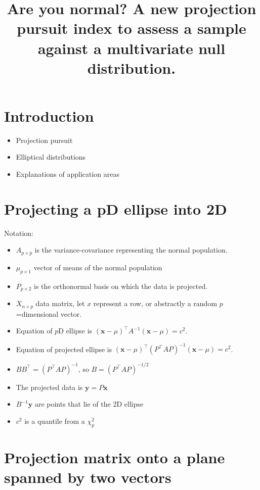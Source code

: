 \documentclass{article}
\title{Are you normal? A new projection pursuit index to assess a sample against a multivariate null distribution.}
\author{}
\renewcommand{\v}[1]{\boldsymbol{#1}}
\begin{document}
\maketitle

\section{Introduction}
\begin{itemize}
    \item Projection pursuit
    \item Elliptical distributions
    \item Explanations of application areas
\end{itemize}


\section{Projecting a pD ellipse into 2D}

Notation:

\begin{itemize}
\item $A_{p\times p}$ is the variance-covariance representing the normal population. 
\item $\mu_{p\times 1}$ vector of means of the normal population
\item $P_{p\times 2}$ is the orthonormal basis on which the data is projected.
\item $X_{n\times p}$ data matrix, let $x$ represent a row, or abstractly a random $p$=dimensional vector. 
\item Equation of $p$D ellipse is $(\v{x}-\mu)^\top A^{-1} (\v{x}-\mu) = c^2$.
\item Equation of projected ellipse is $(\v{x}-\mu)^\top (P^\top AP)^{-1}(\v{x}-\mu) = c^2$. 
\item $BB^\top = (P^\top AP)^{-1}$, so $B=(P^\top AP)^{-1/2}$
\item The projected data is $\v{y}=P\v{x}$
\item $B^{-1}\v{y}$ are points that lie of the 2D ellipse
\item $c^2$ is a quantile from a $\chi^2_p$
\end{itemize}



\section{Projection matrix onto a plane spanned by two vectors} \label{sec:orthonormal}
\end{document}
